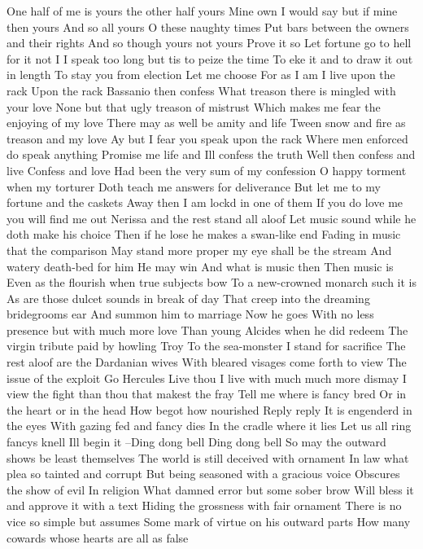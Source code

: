 One half of me is yours the other half yours
Mine own I would say but if mine then yours
And so all yours O these naughty times
Put bars between the owners and their rights
And so though yours not yours Prove it so
Let fortune go to hell for it not I
I speak too long but tis to peize the time
To eke it and to draw it out in length
To stay you from election
Let me choose
For as I am I live upon the rack
Upon the rack Bassanio then confess
What treason there is mingled with your love
None but that ugly treason of mistrust
Which makes me fear the enjoying of my love
There may as well be amity and life
Tween snow and fire as treason and my love
Ay but I fear you speak upon the rack
Where men enforced do speak anything
Promise me life and Ill confess the truth
Well then confess and live
Confess and love
Had been the very sum of my confession
O happy torment when my torturer
Doth teach me answers for deliverance
But let me to my fortune and the caskets
Away then I am lockd in one of them
If you do love me you will find me out
Nerissa and the rest stand all aloof
Let music sound while he doth make his choice
Then if he lose he makes a swan-like end
Fading in music that the comparison
May stand more proper my eye shall be the stream
And watery death-bed for him He may win
And what is music then Then music is
Even as the flourish when true subjects bow
To a new-crowned monarch such it is
As are those dulcet sounds in break of day
That creep into the dreaming bridegrooms ear
And summon him to marriage Now he goes
With no less presence but with much more love
Than young Alcides when he did redeem
The virgin tribute paid by howling Troy
To the sea-monster I stand for sacrifice
The rest aloof are the Dardanian wives
With bleared visages come forth to view
The issue of the exploit Go Hercules
Live thou I live with much much more dismay
I view the fight than thou that makest the fray
Tell me where is fancy bred
Or in the heart or in the head
How begot how nourished
Reply reply
It is engenderd in the eyes
With gazing fed and fancy dies
In the cradle where it lies
Let us all ring fancys knell
Ill begin it --Ding dong bell
Ding dong bell
So may the outward shows be least themselves
The world is still deceived with ornament
In law what plea so tainted and corrupt
But being seasoned with a gracious voice
Obscures the show of evil In religion
What damned error but some sober brow
Will bless it and approve it with a text
Hiding the grossness with fair ornament
There is no vice so simple but assumes
Some mark of virtue on his outward parts
How many cowards whose hearts are all as false

